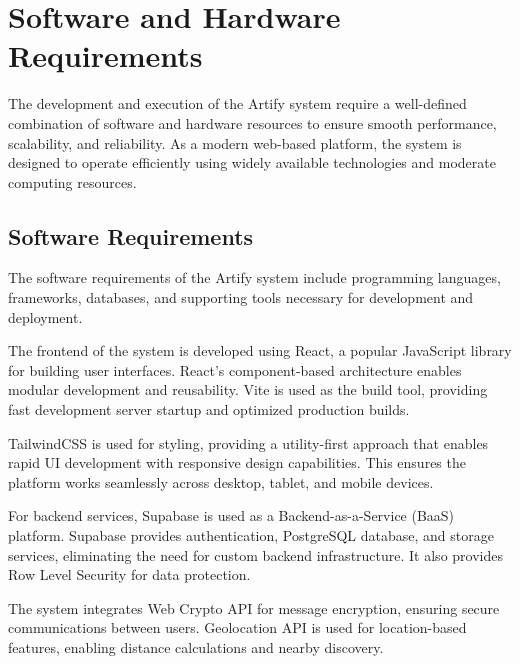 \documentclass[12pt,a4paper]{report}
\begin{document}
\setcounter{chapter}{3}
\clearpage
\thispagestyle{empty}

\noindent
{}

\clearpage
{}
\setcounter{section}{0}
\section{Software and Hardware Requirements}

The development and execution of the Artify system require a well-defined combination of software and hardware resources to ensure smooth performance, scalability, and reliability. As a modern web-based platform, the system is designed to operate efficiently using widely available technologies and moderate computing resources.

\subsection{Software Requirements}

The software requirements of the Artify system include programming languages, frameworks, databases, and supporting tools necessary for development and deployment.

The frontend of the system is developed using React, a popular JavaScript library for building user interfaces. React's component-based architecture enables modular development and reusability. Vite is used as the build tool, providing fast development server startup and optimized production builds.

TailwindCSS is used for styling, providing a utility-first approach that enables rapid UI development with responsive design capabilities. This ensures the platform works seamlessly across desktop, tablet, and mobile devices.

For backend services, Supabase is used as a Backend-as-a-Service (BaaS) platform. Supabase provides authentication, PostgreSQL database, and storage services, eliminating the need for custom backend infrastructure. It also provides Row Level Security for data protection.

The system integrates Web Crypto API for message encryption, ensuring secure communications between users. Geolocation API is used for location-based features, enabling distance calculations and nearby discovery.
\end{document}
